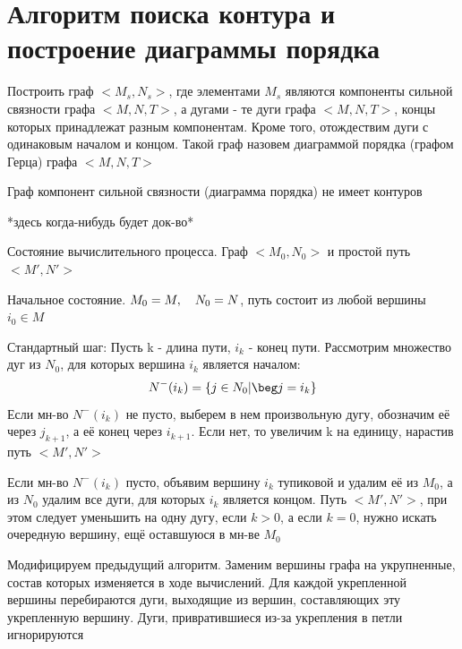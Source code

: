 \documentclass[discrete.tex]{subfiles}
\begin{document}
  \section{Алгоритм поиска контура и построение диаграммы порядка}

  \begin{task}
    Построить граф $<M_s,N_s>$, где элементами $M_s$ являются компоненты сильной связности графа $<M,N,T>$, а дугами - те дуги графа $<M,N,T>$, концы которых принадлежат разным компонентам. Кроме того, отождествим дуги с одинаковым началом и концом. Такой граф назовем диаграммой порядка (графом Герца) графа $<M,N,T>$
  \end{task}

  \begin{ttheorem}
    Граф компонент сильной связности (диаграмма порядка) не имеет контуров
  \end{ttheorem}

  \begin{pproof}
    *здесь когда-нибудь будет док-во*
  \end{pproof}

  \begin{alg}
    Состояние вычислительного процесса. Граф $<M_0, N_0>$ и простой путь $<M',N'>$

    Начальное состояние. $M_0 = M,\quad N_0 = N$, путь состоит из любой вершины $i_0 \in M$

    Стандартный шаг: Пусть k - длина пути, $i_k$ - конец пути. Рассмотрим множество дуг из $N_0$, для которых вершина $i_k$ является началом:
    \[N^-(i_k) = \{j \in N_0 | \beg j = i_k\}\]
    Если мн-во $N^-(i_k)$ не пусто, выберем в нем произвольную дугу, обозначим её через $j_{k+1}$, а её конец через $i_{k+1}$. Если нет, то увеличим k на единицу, нарастив путь $<M', N'>$

    Если мн-во $N^-(i_k)$ пусто, объявим вершину $i_k$ тупиковой и удалим её из $M_0$, а из $N_0$ удалим все дуги, для которых $i_k$ является концом. Путь $<M',N'>$, при этом следует уменьшить на одну дугу, если $k>0$, а если $k=0$, нужно искать очередную вершину, ещё оставшуюся в мн-ве $M_0$
  \end{alg}

  \begin{alg}
    Модифицируем предыдущий алгоритм. Заменим вершины графа на укрупненные, состав которых изменяется в ходе вычислений. Для каждой укрепленной вершины перебираются дуги, выходящие из вершин, составляющих эту укрепленную вершину. Дуги, привратившиеся из-за укрепления в петли игнорируются
  \end{alg}
\end{document}
